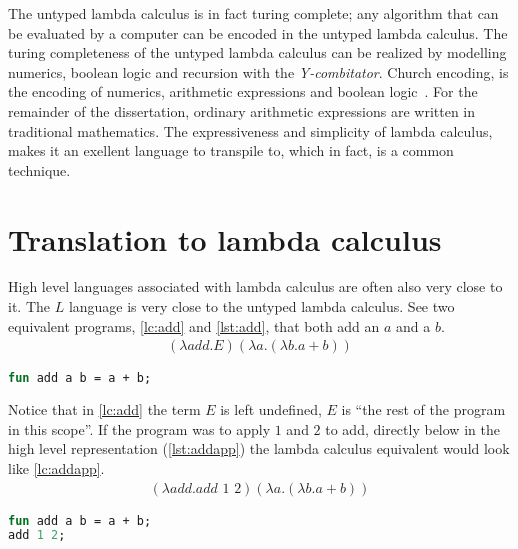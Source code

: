 \documentclass[11pt,oneside,a4paper]{report}
\begin{document}
The untyped lambda calculus is in fact turing complete; any algorithm that can be evaluated by a computer can be encoded in the untyped lambda calculus.
The turing completeness of the untyped lambda calculus can be realized by modelling numerics, boolean logic and recursion with the \textit{Y-combitator}.
Church encoding, is the encoding of numerics, arithmetic expressions and boolean logic~\cite{church1985calculi}.
For the remainder of the dissertation, ordinary arithmetic expressions are written in traditional mathematics.
The expressiveness and simplicity of lambda calculus, makes it an exellent language to transpile to, which in fact, is a common technique.

\section{Translation to lambda calculus}
High level languages associated with lambda calculus are often also very close to it.
The $L$ language is very close to the untyped lambda calculus.
See two equivalent programs, \autoref{lc:add} and \autoref{lst:add}, that both add an $a$ and a $b$.
\begin{align}
(\lambda add . E)(\lambda a . (\lambda b . a + b))
\label{lc:add}
\end{align}
\begin{CenteredBox}
    
\end{CenteredBox}
\begin{lstlisting}[language=ML,caption={Add function},label={lst:add}]
fun add a b = a + b;
\end{lstlisting}
Notice that in \autoref{lc:add} the term $E$ is left undefined, $E$ is ``the rest of the program in this scope''.
If the program was to apply $1$ and $2$ to add, directly below in the high level representation (\autoref{lst:addapp}) the lambda calculus equivalent would look like \autoref{lc:addapp}.
\begin{align}
    (\lambda add . add \,\, 1 \,\, 2)(\lambda a . (\lambda b . a + b))
\label{lc:addapp}
\end{align}
\begin{lstlisting}[language=ML,caption={Add function applied},label={lst:addapp}]
fun add a b = a + b;
add 1 2;
\end{lstlisting}
\end{document}
